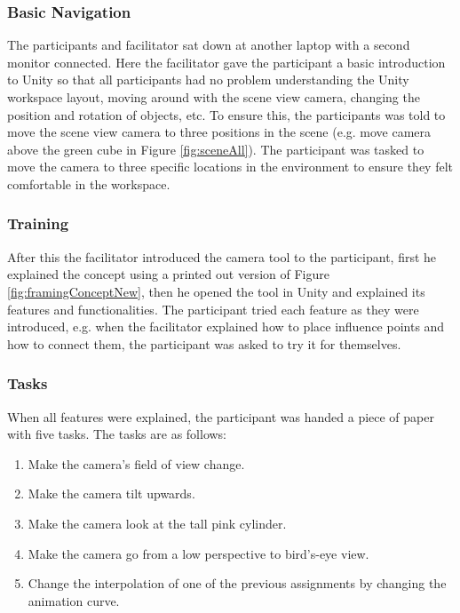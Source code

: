 \subsubsection{Basic Navigation} %
The participants and facilitator sat down at another laptop with a second monitor connected. Here the facilitator gave the participant a basic introduction to Unity so that all participants had no problem understanding the Unity workspace layout, moving around with the scene view camera, changing the position and rotation of objects, etc. To ensure this, the participants was told to move the scene view camera to three positions in the scene (e.g. move camera above the green cube in Figure \ref{fig:sceneAll}). The participant was tasked to move the camera to three specific locations in the environment to ensure they felt comfortable in the workspace. 

\subsubsection{Training}  %
After this the facilitator introduced the camera tool to the participant, first he explained the concept using a printed out version of Figure \ref{fig:framingConceptNew}, then he opened the tool in Unity and explained its features and functionalities. The participant tried each feature as they were introduced, e.g. when the facilitator explained how to place influence points and how to connect them, the participant was asked to try it for themselves. 

\subsubsection{Tasks}%
When all features were explained, the participant was handed a piece of paper with five tasks. The tasks are as follows:

\begin{enumerate}
\item Make the camera's field of view change.
\item Make the camera tilt upwards.
\item Make the camera look at the tall pink cylinder.
\item Make the camera go from a low perspective to bird’s-eye view.
\item Change the interpolation of one of the previous assignments by changing the animation curve.
\end{enumerate} 

